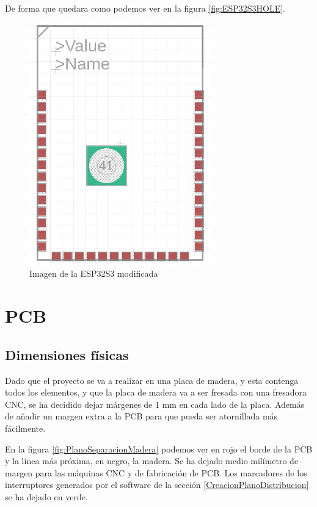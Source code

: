 De forma que quedara como podemos ver en la figura \ref{fig:ESP32S3HOLE}.

\begin{figure}[H]
    \centering
    \includegraphics[width=0.7\textwidth]{imagenes/Capitulos/Cap13/ESP32S3HOLE.png}
    \caption{Imagen de la ESP32S3 modificada}
\end{figure}\label{fig:ESP32S3HOLE}

\section{PCB}\label{ApendicePCB}

\subsection{Dimensiones físicas}
Dado que el proyecto se va a realizar en una placa de madera, y esta contenga todos los elementos, y que la placa de madera va a ser fresada con una fresadora CNC, se ha decidido dejar márgenes de 1 mm en cada lado de la placa. Además de añadir un margen extra a la \gls{PCB} para que pueda ser atornillada más fácilmente.

En la figura \ref{fig:PlanoSeparacionMadera} podemos ver en rojo el borde de la \gls{PCB} y la línea más próxima, en negro, la madera. Se ha dejado medio milímetro de margen para las máquinas \gls{CNC} y de fabricación de \gls{PCB}. Los marcadores de los interruptores generados por el software de la sección \ref{CreacionPlanoDistribucion} se ha dejado en verde.

